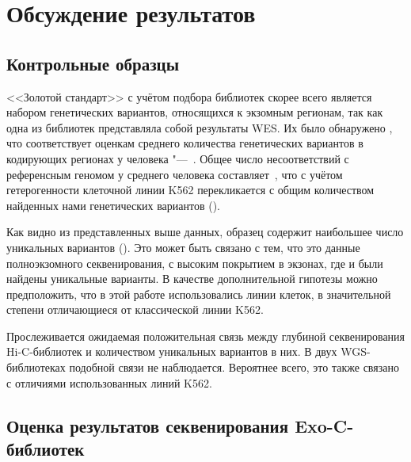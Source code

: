 \documentclass[a4paper,14pt]{extarticle}
\newcommand{\thousands}{тыс.}
\newcommand{\mln}{млн}
\newcommand{\ecitep}[1]{\textenglish{\citep{#1}}}
\begin{document}
\section{Обсуждение результатов}

\subsection{Контрольные образцы}

<<Золотой стандарт>> с учётом подбора библиотек скорее всего является набором генетических вариантов, относящихся к экзомным регионам, так как одна из библиотек представляла собой результаты WES.
Их было обнаружено \numprint[\thousands]{75}, что соответствует оценкам среднего количества генетических вариантов в кодирующих регионах у человека "--- \numprint[\thousands]{100}\,\ecitep{Supernat_2018}.
Общее число несоответствий с референсным геномом у среднего человека составляет \numprint[\mln]{4.1--5}\,\ecitep{Auton_2015}, что с учётом гетерогенности клеточной линии K562 перекликается с общим количеством найденных нами генетических вариантов (\numprint[\mln]{5.5}).

Как видно из представленных выше данных, образец \citeauthor{Banaszak_2018} содержит наибольшее число уникальных вариантов ().
Это может быть связано с тем, что это данные полноэкзомного секвенирования, с высоким покрытием в экзонах, где и были найдены уникальные варианты.
В качестве дополнительной гипотезы можно предположить, что в этой работе использовались линии клеток, в значительной степени отличающиеся от классической линии K562.

Прослеживается ожидаемая положительная связь между глубиной секвенирования Hi-C\hyp{}библиотек и количеством уникальных вариантов в них.
В двух WGS\hyp{}библиотеках подобной связи не наблюдается.
Вероятнее всего, это также связано с отличиями использованных линий K562.

\subsection{Оценка результатов секвенирования Exo-C\hyp{}библиотек}
\end{document}
